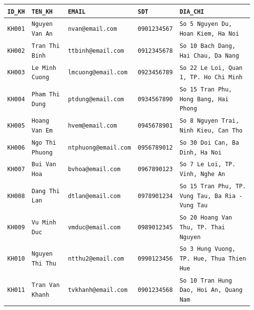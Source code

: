 \documentclass[11pt]{report}
\begin{document}
\begin{table}[H]
    \centering
    \renewcommand{\tabularxcolumn}[1]{m{#1}}
    \begin{tabularx}{\textwidth}{|>{\scriptsize}l|>{\scriptsize}l|>{\scriptsize}l|>{\scriptsize}l|>{\raggedright\arraybackslash\scriptsize}X|} \hline
        \rowcolor{teal!30}
        \textbf{\texttt{ID\_KH}} & \textbf{\texttt{TEN\_KH}} & \textbf{\texttt{EMAIL}} & \textbf{\texttt{SDT}} & \textbf{\texttt{DIA\_CHI}} \\ \hline
        \texttt{KH001} & \texttt{Nguyen Van An}   & \texttt{nvan@email.com}     & \texttt{0901234567} & \texttt{So 5 Nguyen Du, Hoan Kiem, Ha Noi} \\ \hline
        \texttt{KH002} & \texttt{Tran Thi Binh}   & \texttt{ttbinh@email.com}   & \texttt{0912345678} & \texttt{So 10 Bach Dang, Hai Chau, Da Nang} \\ \hline
        \texttt{KH003} & \texttt{Le Minh Cuong}   & \texttt{lmcuong@email.com}  & \texttt{0923456789} & \texttt{So 22 Le Loi, Quan 1, TP. Ho Chi Minh} \\ \hline
        \texttt{KH004} & \texttt{Pham Thi Dung}   & \texttt{ptdung@email.com}   & \texttt{0934567890} & \texttt{So 15 Tran Phu, Hong Bang, Hai Phong} \\ \hline
        \texttt{KH005} & \texttt{Hoang Van Em}    & \texttt{hvem@email.com}     & \texttt{0945678901} & \texttt{So 8 Nguyen Trai, Ninh Kieu, Can Tho} \\ \hline
        \texttt{KH006} & \texttt{Ngo Thi Phuong}  & \texttt{ntphuong@email.com} & \texttt{0956789012} & \texttt{So 30 Doi Can, Ba Dinh, Ha Noi} \\ \hline
        \texttt{KH007} & \texttt{Bui Van Hoa}     & \texttt{bvhoa@email.com}    & \texttt{0967890123} & \texttt{So 7 Le Loi, TP. Vinh, Nghe An} \\ \hline
        \texttt{KH008} & \texttt{Dang Thi Lan}    & \texttt{dtlan@email.com}    & \texttt{0978901234} & \texttt{So 15 Tran Phu, TP. Vung Tau, Ba Ria - Vung Tau} \\ \hline
        \texttt{KH009} & \texttt{Vu Minh Duc}     & \texttt{vmduc@email.com}    & \texttt{0989012345} & \texttt{So 20 Hoang Van Thu, TP. Thai Nguyen} \\ \hline
        \texttt{KH010} & \texttt{Nguyen Thi Thu}  & \texttt{ntthu2@email.com}   & \texttt{0990123456} & \texttt{So 3 Hung Vuong, TP. Hue, Thua Thien Hue} \\ \hline
        \texttt{KH011} & \texttt{Tran Van Khanh}  & \texttt{tvkhanh@email.com}  & \texttt{0901234568} & \texttt{So 10 Tran Hung Dao, Hoi An, Quang Nam} \\ \hline

\end{tabularx}
\end{table}
\end{document}
